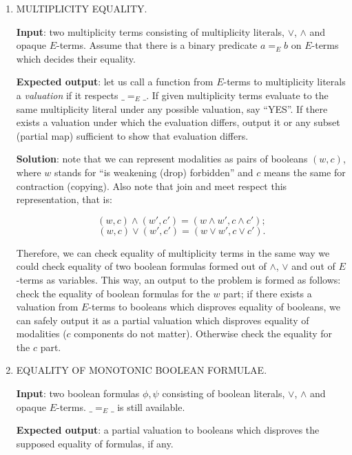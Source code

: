 \documentclass[a4paper,14pt]{extreport}
\begin{document}
\begin{enumerate}
    \item MULTIPLICITY EQUALITY.

        \textbf{Input}: two multiplicity terms consisting of multiplicity
        literals, $\lor$, $\land$ and opaque $E$-terms. Assume that there is a
        binary predicate $a =_E b$ on $E$-terms which decides their equality.

        \textbf{Expected output}: let us call a function from $E$-terms to
        multiplicity literals a \textit{valuation} if it respects $\_ =_E \_$.
        If given multiplicity terms evaluate to the same multiplicity literal
        under any possible valuation, say ``YES''. If there exists a valuation
        under which the evaluation differs, output it or any subset (partial
        map) sufficient to show that evaluation differs.

        \textbf{Solution}: note that we can represent modalities as pairs of
        booleans $(w, c)$, where $w$ stands for ``is weakening (drop)
        forbidden'' and $c$ means the same for contraction (copying). Also note
        that join and meet respect this representation, that is:

        \[ (w, c) \land (w', c') = (w \land w', c \land c'); \]
        \[ (w, c) \lor (w', c') = (w \lor w', c \lor c'). \]

        Therefore, we can check equality of multiplicity terms in the same way
        we could check equality of two boolean formulas formed out of $\land$,
        $\lor$ and out of $E$-terms as variables. This way, an output to the
        problem is formed as follows: check the equality of boolean formulas for
        the $w$ part; if there exists a valuation from $E$-terms to booleans
        which disproves equality of booleans, we can safely output it as a
        partial valuation which disproves equality of modalities ($c$ components
        do not matter). Otherwise check the equality for the $c$ part.

    \item EQUALITY OF MONOTONIC BOOLEAN FORMULAE.

        \textbf{Input}: two boolean formulas $\phi, \psi$ consisting of boolean
        literals, $\lor$, $\land$ and opaque $E$-terms. $\_ =_E \_$ is still
        available.

        \textbf{Expected output}: a partial valuation to booleans which
        disproves the supposed equality of formulas, if any.


\end{enumerate}
\end{document}
